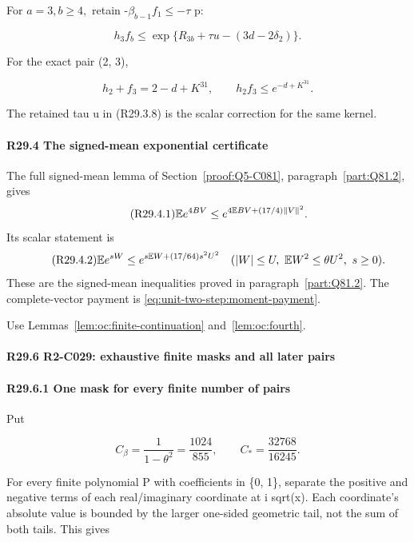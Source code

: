 For \(a=3,\allowbreak  b\ge 4,\allowbreak \) retain -\(\beta_{b-1}f_1\le -\tau\) p:

\[
h_3f_b\le
\exp\{R_{3b}+\tau u-(3d-2\delta_2)\}.
\tag{R29.3.8}
\]

For the exact pair (2, 3),

\[
h_2+f_3=2-d+K^31,\qquad h_2f_3\le e^{-d+K^31}.
\tag{R29.3.9}
\]

The retained tau u in (R29.3.8) is the scalar correction for the same kernel.

\paragraph{R29.4 The signed-mean exponential certificate}\label{calc:five-signed-exp}
The full signed-mean lemma of Section~\ref{proof:Q5-C081},
paragraph~\ref{part:Q81.2}, gives
\begin{equation}\tag{R29.4.1}\label{eq:oc:r29-signed}
 \mathbb E e^{4BV}\le e^{4\mathbb E BV+(17/4)\|V\|^2}.
\end{equation}
Its scalar statement is
\begin{equation}\tag{R29.4.2}\label{eq:oc:r29-scalar-signed}
 \mathbb E e^{sW}\le e^{s\mathbb E W+(17/64)s^2U^2}
 \quad(|W|\le U,\ \mathbb E W^2\le\theta U^2,\ s\ge0).
\end{equation}
These are the signed-mean inequalities proved in
paragraph~\ref{part:Q81.2}. The complete-vector payment is
\eqref{eq:unit-two-step:moment-payment}.

Use Lemmas~\ref{lem:oc:finite-continuation} and~\ref{lem:oc:fourth}.

\paragraph{R29.6 R2-C029: exhaustive finite masks and all later pairs}\label{part:R29.6}

\paragraph{R29.6.1 One mask for every finite number of pairs}

Put

\[
C_\beta=\frac1{1-\theta^2}=\frac{1024}{855},\qquad
C_*=\frac{32768}{16245}.
\]

For every finite polynomial P with coefficients in \{0, 1\}, separate
the positive and negative terms of each real/imaginary coordinate at
i sqrt(x). Each coordinate's absolute value is bounded by the larger
one-sided geometric tail, not the sum of both tails. This gives

